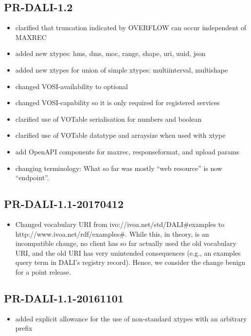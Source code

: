 \documentclass[11pt,letter]{ivoa}
\begin{document}
\subsection{PR-DALI-1.2}
\begin{itemize}
\item clarified that truncation indicated by OVERFLOW can occur independent of
MAXREC
\item added new xtypes: hms, dms, moc, range, shape, uri,
uuid, json
\item added new xtypes for union of simple xtypes: multiinterval, multishape
\item changed VOSI-availability to optional
\item changed VOSI-capability so it is only required for registered services
\item clarified use of VOTable serialisation for numbers and boolean
\item clarified use of VOTable datatype and arraysize when used with xtype
\item add OpenAPI components for maxrec, responseformat, and upload params
\item changing terminology: What so far was mostly ``web resource'' is now
``endpoint''.
\end{itemize}

\subsection{PR-DALI-1.1-20170412}

\begin{itemize}
\item Changed vocabulary URI from ivo://ivoa.net/std/DALI\#examples to
http://www.ivoa.net/rdf/examples\#.  While this, in theory, is an
incompatible change, no client has so far actually used the old vocabulary
URI, and the old URI has very unintended consequences (e.g., an
examples query term in DALI's registry record).  Hence, we consider the
change benign for a point release.
\end{itemize}

\subsection{PR-DALI-1.1-20161101}

\begin{itemize}
\item added explicit allowance for the use of non-standard xtypes with an
arbitrary prefix
\end{itemize}
\end{document}
